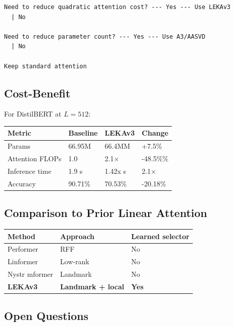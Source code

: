 \begin{lstlisting}
Need to reduce quadratic attention cost? --- Yes --- Use LEKAv3
  | No
   
Need to reduce parameter count? --- Yes --- Use A3/AASVD
  | No
   
Keep standard attention
\end{lstlisting}

\subsection{Cost-Benefit}

For DistilBERT at $L = 512$:

\begin{table}[H]
\centering
\small
\begin{tabular}{llll}
\toprule
\textbf{Metric} & \textbf{Baseline} & \textbf{LEKAv3} & \textbf{Change} \\
\midrule
Params & 66.95M & 66.4MM & +7.5\% \\
Attention FLOPs & 1.0 & 2.1$\times$ & -48.5\%\% \\
Inference time & 1.9 s & 1.42x s & 2.1$\times$ \\
Accuracy & 90.71\% & 70.53\% & -20.18\% \\
\bottomrule
\end{tabular}
\end{table}

\subsection{Comparison to Prior Linear Attention}

\begin{table}[H]
\centering
\small
\begin{tabular}{lll}
\toprule
\textbf{Method} & \textbf{Approach} & \textbf{Learned selector} \\
\midrule
Performer & RFF & No \\
Linformer & Low-rank & No \\
Nystr mformer & Landmark & No \\
\textbf{LEKAv3} & \textbf{Landmark + local} & \textbf{Yes} \\
\bottomrule
\end{tabular}
\end{table}

\subsection{Open Questions}

